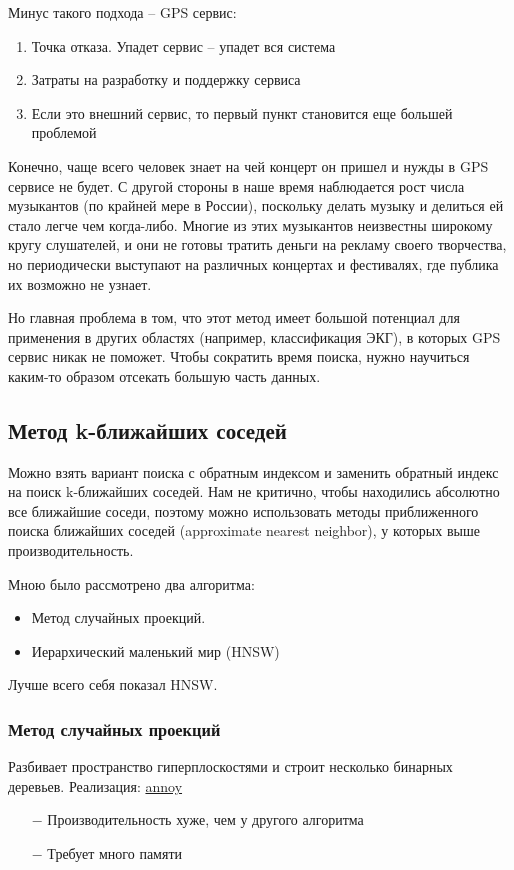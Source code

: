 Минус такого подхода -- GPS сервис:
\begin{enumerate}[label=\arabic*.]
    \item Точка отказа. Упадет сервис -- упадет вся система
    \item Затраты на разработку и поддержку сервиса
    \item Если это внешний сервис, то первый пункт становится еще большей проблемой
\end{enumerate}

Конечно, чаще всего человек знает на чей концерт он пришел и нужды в GPS сервисе не будет.
С другой стороны в наше время наблюдается рост числа музыкантов (по крайней мере в России),
поскольку делать музыку и делиться ей стало легче чем когда-либо.
Многие из этих музыкантов неизвестны широкому кругу слушателей, и они не готовы тратить
деньги на рекламу своего творчества, но периодически выступают на различных концертах
и фестивалях, где публика их возможно не узнает.

Но главная проблема в том, что этот метод имеет большой потенциал для применения
в других областях (например, классификация ЭКГ), в которых GPS сервис никак не поможет.
Чтобы сократить время поиска, нужно научиться каким-то образом отсекать большую часть данных.

\subsection{Метод k-ближайших соседей}
Можно взять вариант поиска с обратным индексом и заменить обратный индекс на
поиск k-ближайших соседей. Нам не критично, чтобы находились абсолютно все ближайшие соседи,
поэтому можно использовать методы приближенного поиска ближайших соседей
(approximate nearest neighbor), у которых выше производительность.

Мною было рассмотрено два алгоритма:
\begin{itemize}
    \item Метод случайных проекций.
    \item Иерархический маленький мир (HNSW)
\end{itemize}

Лучше всего себя показал HNSW.

\subsubsection{Метод случайных проекций}
Разбивает пространство гиперплоскостями и строит несколько бинарных деревьев.
Реализация: \href{https://github.com/spotify/annoy}{annoy}
\begin{itemize}
    \item[$-$] Производительность хуже, чем у другого алгоритма
    \item[$-$] Требует много памяти
\end{itemize}

